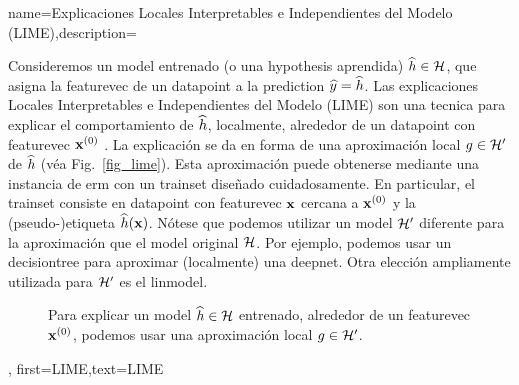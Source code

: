 {name={Explicaciones Locales Interpretables e Independientes del Modelo (LIME)},description={
		Consideremos 
		un \gls{model} entrenado (o una \gls{hypothesis} aprendida) $\widehat{h} \in \mathcal{H}$, 
		que asigna la \gls{featurevec} de un \gls{datapoint} a la \gls{prediction} $\widehat{y}= \widehat{h}$. 
		Las explicaciones Locales Interpretables e Independientes del Modelo (LIME) son una tecnica para explicar 
		el comportamiento de $\widehat{h}$, localmente, alrededor de un \gls{datapoint} con \gls{featurevec} ${\bf x}^{(0)}$ \cite{Ribeiro2016}. 
		La explicación se da en forma de una aproximación local $g \in \mathcal{H}'$ de $\widehat{h}$ (véa Fig.\ \ref{fig_lime}). 
		Esta aproximación puede obtenerse mediante una instancia de \gls{erm} con un 
		\gls{trainset} diseñado cuidadosamente. En particular, el \gls{trainset} consiste en \gls{datapoint} con 
		\gls{featurevec} ${\bf x}$ cercana a ${\bf x}^{(0)}$ y la (pseudo-)etiqueta $\widehat{h}({\bf x})$. 
		Nótese que podemos utilizar un \gls{model} $\mathcal{H}'$ diferente para la aproximación que 
		el \gls{model} original $\mathcal{H}$. Por ejemplo, podemos usar un \gls{decisiontree} 
		para aproximar (localmente) una \gls{deepnet}. Otra elección ampliamente utilizada para $\mathcal{H}'$ es 
		el \gls{linmodel}. 
		\begin{figure}[htbp]
		\begin{center}
		\end{center}
		\caption{Para explicar un \gls{model} $\widehat{h} \in \mathcal{H}$ entrenado, alrededor de un \gls{featurevec} ${\bf x}^{(0)}$, podemos usar una aproximación local $g \in \mathcal{H}'$. }
		\end{figure}\label{fig_lime}},
	first={LIME},text={LIME}
}


